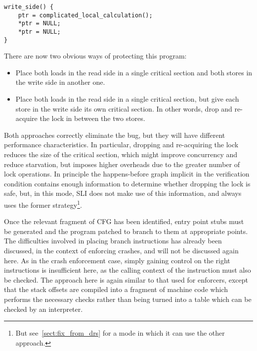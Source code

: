 \begin{verbatim}
write_side() {
    ptr = complicated_local_calculation();
    *ptr = NULL;
    *ptr = NULL;
}
\end{verbatim}
    
There are now two obvious ways of protecting this program:

\begin{itemize}
\item
  Place both loads in the read side in a single critical section and
  both stores in the write side in another one.
\item
  Place both loads in the read side in a single critical section, but
  give each store in the write side its own critical section.  In
  other words, drop and re-acquire the lock in between the two stores.
\end{itemize}

Both approaches correctly eliminate the bug, but they will have
different performance characteristics.  In particular, dropping and
re-acquiring the lock reduces the size of the critical section, which
might improve concurrency and reduce starvation, but imposes higher
overheads due to the greater number of lock operations.  In principle
the happens-before graph implicit in the verification condition
contains enough information to determine whether dropping the lock is
safe, but, in this mode, SLI does not make use of this information,
and always uses the former strategy\footnote{But
  see~\ref{sect:fix_from_drs} for a mode in which it can use the other
  approach.}.

Once the relevant fragment of CFG has been identified, entry point
stubs must be generated and the program patched to branch to them at
appropriate points.  The difficulties involved in placing branch
instructions has already been discussed, in the context of enforcing
crashes, and will not be discussed again here.  As in the crash
enforcement case, simply gaining control on the right instructions is
insufficient here, as the calling context of the instruction must also
be checked.  The approach here is again similar to that used for
enforcers, except that the stack offsets are compiled into a fragment
of machine code which performs the necessary checks rather than being
turned into a table which can be checked by an interpreter.

